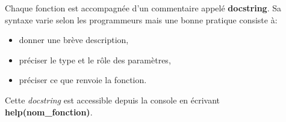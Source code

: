 \documentclass[a4paper,11pt]{article}
\begin{document}
\begin{Form}
\begin{aretenir}[Commentaire]
Chaque fonction est accompagnée d'un commentaire appelé \textbf{docstring}. Sa syntaxe varie selon les programmeurs mais une bonne pratique consiste à:
\begin{itemize}
\item donner une brève description,
\item préciser le type et le rôle des paramètres,
\item préciser ce que renvoie la fonction.
\end{itemize}
Cette \emph{docstring} est accessible depuis la console en écrivant \textbf{help(nom\_fonction)}.
\end{aretenir}
\begin{exo}

\end{exo}
\begin{exo}

\end{exo}
\begin{exo}

\end{exo}
\begin{exo}

\end{exo}
\begin{exo}

\end{exo}
\begin{exo}

\end{exo}
\begin{exo}

\end{exo}
\begin{exo}

\end{exo}
\begin{exo}

\end{exo}
\begin{exo}

\end{exo}
\begin{exo}

\end{exo}
\begin{exo}

\end{exo}
\begin{exo}

\end{exo}
\end{Form}
\end{document}

